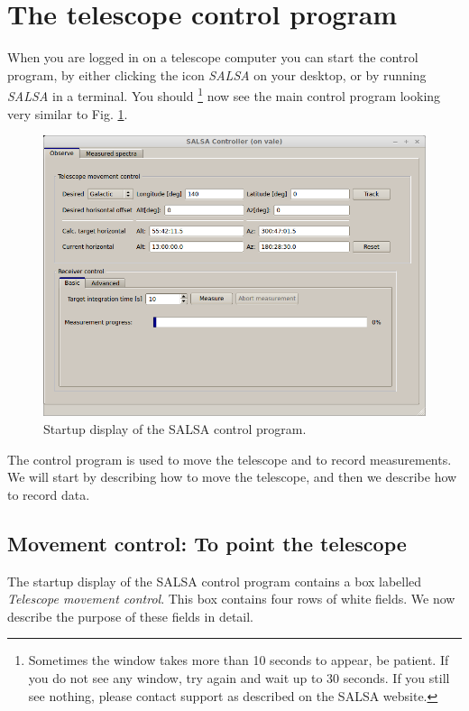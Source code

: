 \section{The telescope control program} 
\label{sect-control}
When you are logged in on a telescope computer you can start the control
program, by either clicking the icon \emph{SALSA} on your desktop, or by
running \emph{SALSA} in a terminal.  You should \footnote{Sometimes the window
	takes more than 10 seconds to appear, be patient. If you do not see any
window, try again and wait up to 30 seconds. If you still see nothing, please
contact support as described on the SALSA website.} now see the main control
program looking very similar to Fig. \ref{fig:controlstart}. 
\begin{figure}[ht]
\begin{center}
\includegraphics[width=\textwidth]{../figures/Controller_start.png}
\end{center}
\caption{Startup display of the SALSA control program.}
\label{fig:controlstart}
\end{figure}
The control program is used to move the telescope and to record measurements.
We will start by describing how to move the telescope, and then we describe
how to record data.

\subsection{Movement control: To point the telescope}
The startup display of the SALSA control program contains a box labelled
\emph{Telescope movement control}. This box contains four rows of white
fields. We now describe the purpose of these fields in detail. 

